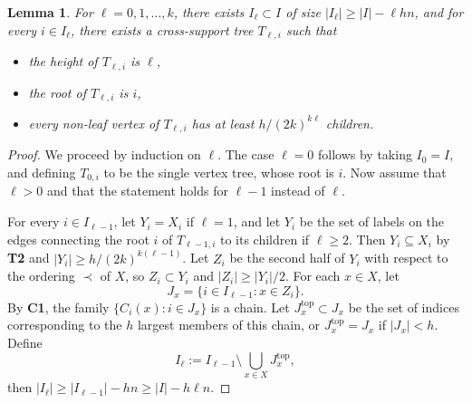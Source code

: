 \documentclass[10pt,a4paper]{amsart}
\newtheorem{lemma}{Lemma}
\begin{document}
 \begin{lemma}
 For $\ell=0,1,\dots,k$, there exists $I_{\ell}\subset I$ of size $|I_{\ell}|\geq |I|-\ell h n$, and for every $i\in I_{\ell}$, there exists a cross-support tree $T_{\ell,i}$ such that 
\begin{itemize}
    \item[(1)] the height of $T_{\ell,i}$ is $\ell$,
    \item[(2)] the root of $T_{\ell,i}$ is $i$,
    \item[(3)] every non-leaf vertex of $T_{\ell,i}$ has at least $h/(2k)^{k\ell}$ children.
\end{itemize}
\end{lemma}

\begin{proof}
We proceed by induction on $\ell$. The case $\ell=0$ follows by taking $I_0=I$, and defining $T_{0,i}$ to be the single vertex tree, whose root is $i$. Now assume that $\ell>0$ and that the statement holds for $\ell-1$ instead of $\ell$.

For every $i\in I_{\ell-1}$, let $Y_i=X_i$ if $\ell=1$, and let $Y_i$ be the set of labels on the edges connecting the root $i$ of $T_{\ell-1,i}$ to its children if $\ell\geq 2$. Then $Y_i\subseteq X_i$ by \textbf{T2} and $|Y_i|\geq h/(2k)^{k(\ell-1)}$. Let $Z_i$ be the second half of $Y_i$ with respect to the ordering $\prec$ of $X$, so $Z_i\subset Y_i$ and $|Z_i|\geq |Y_i|/2$. For each $x\in X$, let 
$$J_x=\{i\in I_{\ell-1}:x\in Z_i\}.$$
By \textbf{C1}, the family $\{C_i(x):i\in J_x\}$ is a chain. Let $J^{\text{top}}_x\subset J_x$ be the set of indices corresponding to the $h$ largest members of this chain, or $J^{\text{top}}_x=J_x$ if $|J_x|<h$. Define 
$$I_{\ell}:=I_{\ell-1}\setminus \bigcup_{x\in X}J_x^{\text{top}},$$
then $|I_{\ell}|\geq |I_{\ell-1}|-hn\geq |I|-h\ell n$.


\end{proof}
\end{document}
